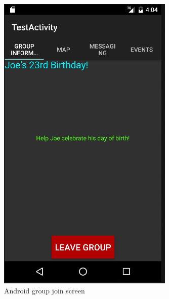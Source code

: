 	\begin{figure}[tbh]
	\begin{center}
	\includegraphics[width=0.75\textwidth]{AndroidPictures/groupJoinedPage.png}
	\end{center}
	\caption{Android group join screen \label{AndroidJoinGroup}}
	\end{figure}


